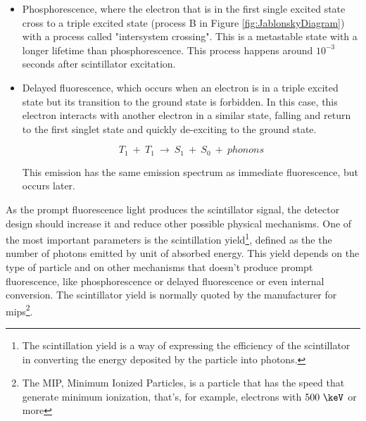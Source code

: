 \begin{itemize}
\item{} Phosphorescence, where the electron that is in the first single excited state cross to a triple excited state (process B in Figure \ref{fig:JablonskyDiagram}) with a process called "intersystem crossing". This is a metastable state with a longer lifetime than phosphorescence. This process happens around $10^{-3}$ seconds after scintillator excitation.

\item{} Delayed fluorescence, which occurs when an electron is in a triple excited state but its transition to the ground state is forbidden. In this case, this electron interacts with another electron in a similar state, falling and return to the first singlet state and quickly de-exciting to the ground state. 

\begin{equation}
T_{1} ~+~ T_{1}~ \longrightarrow ~ S_{1} ~+~ S_{0} ~+~ phonons
\label{eq:DelayFluorescence}
\end{equation}

This emission has the same emission spectrum as immediate fluorescence, but occurs later.
\end{itemize}
As the prompt fluorescence light produces the scintillator signal, the detector design should increase it and reduce other possible physical mechanisms. One of the most important parameters is the scintillation yield\footnote{The scintillation yield is a way of expressing the efficiency of the scintillator in converting the energy deposited by the particle into photons.}, defined as the the number of photons emitted by unit of absorbed energy. This yield depends on the type of particle and on other mechanisms that doesn't produce prompt fluorescence, like phosphorescence or delayed fluorescence or even internal conversion. The scintillator yield is normally quoted by the manufacturer for mips\footnote{The MIP, Minimum Ionized Particles, is a particle that has the speed that generate minimum ionization, that's, for example, electrons with $500~\keV$ or more}.
